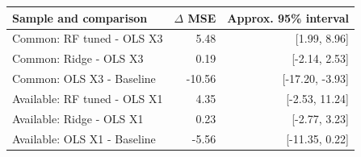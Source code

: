 \begin{tabular}{@{}p{7cm}rr@{}}
\toprule
Sample and comparison & $\Delta$ MSE & Approx. 95\% interval \\
\midrule
Common: RF tuned - OLS X3 & 5.48 & [1.99, 8.96] \\
Common: Ridge - OLS X3 & 0.19 & [-2.14, 2.53] \\
Common: OLS X3 - Baseline & -10.56 & [-17.20, -3.93] \\
Available: RF tuned - OLS X1 & 4.35 & [-2.53, 11.24] \\
Available: Ridge - OLS X1 & 0.23 & [-2.77, 3.23] \\
Available: OLS X1 - Baseline & -5.56 & [-11.35, 0.22] \\
\bottomrule
\end{tabular}

